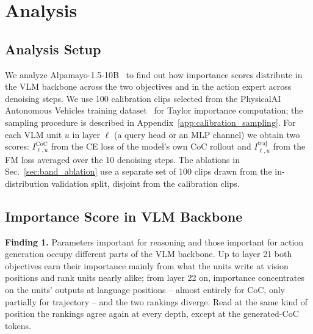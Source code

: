 \section{Analysis}
\label{sec:analysis}


\subsection{Analysis Setup}
\label{sec:analysis_setup}

We analyze Alpamayo-1.5-10B~\cite{wang2025alpamayo} to find out how importance scores distribute in the VLM backbone across the two objectives and in the action expert across denoising steps. We use 100 calibration clips selected from the PhysicalAI Autonomous Vehicles training dataset~\cite{wang2025alpamayo} for Taylor importance computation; the sampling procedure is described in Appendix~\ref{app:calibration_sampling}. For each VLM unit $u$ in layer $\ell$ (a query head or an MLP channel) we obtain two scores: $I^{\mathrm{CoC}}_{\ell,u}$ from the CE loss of the model's own CoC rollout and $I^{\mathrm{traj}}_{\ell,u}$ from the FM loss averaged over the 10 denoising steps. The ablations in Sec.~\ref{sec:band_ablation} use a separate set of 100 clips drawn from the in-distribution validation split, disjoint from the calibration clips.

\subsection{Importance Score in VLM Backbone}
\label{sec:vlm_analysis}

\begin{finding}
\textbf{Finding 1.} Parameters important for reasoning and those important for action generation occupy different parts of the VLM backbone. Up to layer 21 both objectives earn their importance mainly from what the units write at vision positions and rank units nearly alike; from layer 22 on, importance concentrates on the units' outputs at language positions -- almost entirely for CoC, only partially for trajectory -- and the two rankings diverge. Read at the same kind of position the rankings agree again at every depth, except at the generated-CoC tokens.
\end{finding}

